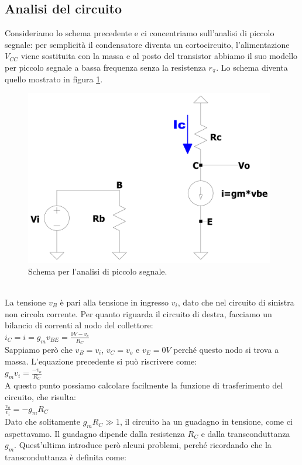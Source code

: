 \documentclass{report}
\begin{document}
\subsection{Analisi del circuito} 
Consideriamo lo schema precedente e ci concentriamo sull'analisi di piccolo segnale: per semplicità il condensatore diventa un cortocircuito, l'alimentazione $V_{CC}$ viene sostituita con la massa e al posto del transistor abbiamo il suo modello per piccolo segnale a bassa frequenza senza la resistenza $r_\pi$. Lo schema diventa quello mostrato in figura \ref{figura:CEv1_ps}.
\begin{figure}[h]
\centering
\includegraphics[height=7.7cm]{immagini/CEv1_ps}
\caption{Schema per l'analisi di piccolo segnale.}
\label{figura:CEv1_ps}
\end{figure}
\\La tensione $v_B$ è pari alla tensione in ingresso $v_i$, dato che nel circuito di sinistra non circola corrente. Per quanto riguarda il circuito di destra, facciamo un bilancio di correnti al nodo del collettore:
\\[2pt]\indent $\displaystyle{i_C=i=g_m v_{BE}=\frac{0V-v_c}{R_C}}$
\\[2pt]Sappiamo però che $v_B=v_i$, $v_C=v_o$ e $v_E=0V$ perché questo nodo si trova a massa. L'equazione precedente si può riscrivere come:
\\[2pt]\indent $\displaystyle{g_m v_i=\frac{-v_o}{R_C}}$
\\[2pt]A questo punto possiamo calcolare facilmente la funzione di trasferimento del circuito, che risulta:
\\[2pt]\indent $\displaystyle{\frac{v_o}{v_i}=-g_m R_C}$
\\[2pt]Dato che solitamente $g_m R_C\gg 1$, il circuito ha un guadagno in tensione, come ci aspettavamo. Il guadagno dipende dalla resistenza $R_C$ e dalla transconduttanza $g_m$. Quest'ultima introduce però alcuni problemi, perché ricordando che la transconduttanza è definita come:
\end{document}
